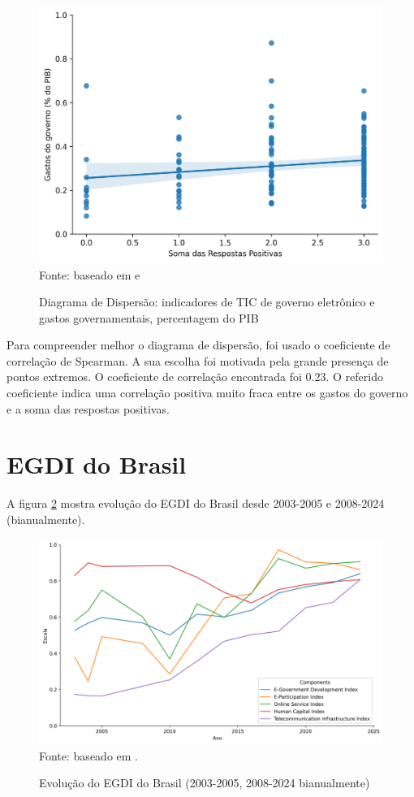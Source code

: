 \begin{figure}[H]
	\centering
	\caption{Diagrama de Dispersão: indicadores de TIC de governo eletrônico e gastos governamentais, percentagem do PIB}
	\includegraphics[width=1\linewidth]{figuras/egdi/dispersao_ticegov_govexpenditure}
	\label{fig:dispersao_ticegov_govexpenditure}
	\footnotesize{Fonte: baseado em \cite{FMI_gov_expenditure} e \cite{ONU_ICT_in_government_indicators}}
\end{figure}

Para compreender melhor o diagrama de dispersão, foi usado o coeficiente de correlação de Spearman. A sua escolha foi motivada pela grande presença de pontos extremos. O coeficiente de correlação encontrada foi 0.23. O referido coeficiente indica uma correlação positiva muito fraca entre os gastos do governo e a soma das respostas positivas. 


\section{EGDI do Brasil}

A figura \ref{fig:lineplot_egdi_brasil} mostra evolução do EGDI do Brasil desde 2003-2005 e 2008-2024 (bianualmente).

\begin{figure}[H]
	\centering
	\caption{Evolução do EGDI do Brasil (2003-2005, 2008-2024 bianualmente)}
	\includegraphics[width=1\linewidth]{figuras/egdi/lineplot_egdi_brasil.png}
	\label{fig:lineplot_egdi_brasil}
	\footnotesize{Fonte: baseado em \cite{ONU_EGDI_mapa}.}
\end{figure}

